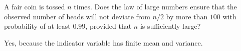 \begin{exercise}
\begin{questions}
\question
A fair coin is tossed $n$ times. Does the law of large numbers ensure that the observed number of heads will not deviate from $n/2$ by more than $100$ with probability of at least $0.99$, provided that $n$ is sufficiently large?
\begin{answer} %
Yes, because the indicator variable has finite mean and variance.
\end{answer}

\end{questions}
\end{exercise}

\endinput
